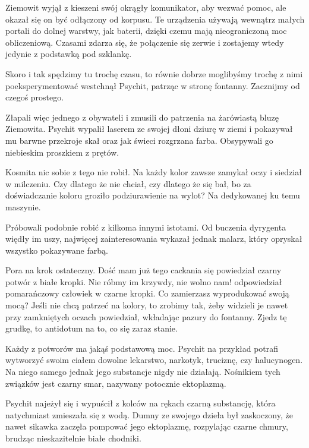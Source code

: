 Ziemowit wyjął z kieszeni swój okrągły komunikator, aby wezwać pomoc, ale okazał się on być odłączony od korpusu.
Te urządzenia używają wewnątrz małych portali do dolnej warstwy, jak baterii, dzięki czemu mają nieograniczoną moc obliczeniową.
Czasami zdarza się, że połączenie się zerwie i zostajemy wtedy jedynie z podstawką pod szklankę.

\divider{}

\begin{dialogue}
\ds{} Skoro i tak spędzimy tu trochę czasu, to równie dobrze moglibyśmy trochę z nimi poeksperymentować \dm{} westchnął Psychit, patrząc w stronę fontanny. \dm{}
Zacznijmy od czegoś prostego.
\end{dialogue}

Złapali więc jednego z obywateli i zmusili do patrzenia na żarówiastą bluzę Ziemowita.
Psychit wypalił laserem ze swojej dłoni dziurę w ziemi i pokazywał mu barwne przekroje skał oraz jak świeci rozgrzana farba.
Obsypywali go niebieskim proszkiem z prętów.

Kosmita nic sobie z tego nie robił. 
Na każdy kolor zawsze zamykał oczy i siedział w milczeniu.
Czy dlatego że nie chciał, czy dlatego że się bał, bo za doświadczanie koloru groziło podziurawienie na wylot? Na dedykowanej ku temu maszynie.

Próbowali podobnie robić z kilkoma innymi istotami.
Od buczenia dyrygenta więdły im uszy, najwięcej zainteresowania wykazał jednak malarz, który opryskał wszystko pokazywane farbą.

\begin{dialogue}
\ds{} Pora na krok ostateczny. Dość mam już tego cackania się \dm{} powiedział czarny potwór z białe kropki.
\ds{} Nie róbmy im krzywdy, nie wolno nam! \dm{} odpowiedział pomarańczowy człowiek w czarne kropki. \dm{} Co zamierzasz wyprodukować swoją mocą?
\ds{} Jeśli nie chcą patrzeć na kolory, to zrobimy tak, żeby widzieli je nawet przy zamkniętych oczach \dm{} powiedział, wkładając pazury do fontanny. \dm{}
Zjedz tę grudkę, to antidotum na to, co się zaraz stanie.
\end{dialogue}

Każdy z potworów ma jakąś podstawową moc. Psychit na przykład potrafi wytworzyć swoim ciałem dowolne lekarstwo, narkotyk, truciznę, czy halucynogen. 
Na niego samego jednak jego substancje nigdy nie działają.
Nośnikiem tych związków jest czarny smar, nazywany potocznie ektoplazmą.

Psychit najeżył się i wypuścił z kolców na rękach czarną substancję, która natychmiast zmieszała się z wodą.
Dumny ze swojego dzieła był zaskoczony, że nawet sikawka zaczęła pompować jego ektoplazmę, rozpylając czarne chmury, brudząc nieskazitelnie białe chodniki.

